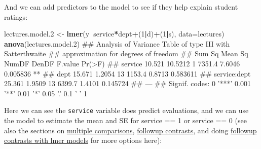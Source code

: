 \documentclass[]{article}
\newenvironment{Shaded}{\begin{snugshade}}{\end{snugshade}}
\newcommand{\KeywordTok}[1]{\textcolor[rgb]{0.13,0.29,0.53}{\textbf{#1}}}
\newcommand{\DataTypeTok}[1]{\textcolor[rgb]{0.13,0.29,0.53}{#1}}
\newcommand{\DecValTok}[1]{\textcolor[rgb]{0.00,0.00,0.81}{#1}}
\newcommand{\StringTok}[1]{\textcolor[rgb]{0.31,0.60,0.02}{#1}}
\newcommand{\OperatorTok}[1]{\textcolor[rgb]{0.81,0.36,0.00}{\textbf{#1}}}
\newcommand{\NormalTok}[1]{#1}
\theoremstyle{definition}
\theoremstyle{definition}
\theoremstyle{definition}
\theoremstyle{remark}
\begin{document}
And we can add predictors to the model to see if they help explain
student ratings:

\begin{Shaded}
\begin{Highlighting}[]
\NormalTok{lectures.model.}\DecValTok{2}\NormalTok{ <-}\StringTok{ }\KeywordTok{lmer}\NormalTok{(y}\OperatorTok{~}\NormalTok{service}\OperatorTok{*}\NormalTok{dept}\OperatorTok{+}\NormalTok{(}\DecValTok{1}\OperatorTok{|}\NormalTok{d)}\OperatorTok{+}\NormalTok{(}\DecValTok{1}\OperatorTok{|}\NormalTok{s), }\DataTypeTok{data=}\NormalTok{lectures)}
\KeywordTok{anova}\NormalTok{(lectures.model.}\DecValTok{2}\NormalTok{)}
\NormalTok{## Analysis of Variance Table of type III  with  Satterthwaite }
\NormalTok{## approximation for degrees of freedom}
\NormalTok{##              Sum Sq Mean Sq NumDF  DenDF F.value   Pr(>F)   }
\NormalTok{## service      10.521 10.5212     1 7351.4  7.6046 0.005836 **}
\NormalTok{## dept         15.671  1.2054    13 1153.4  0.8713 0.583611   }
\NormalTok{## service:dept 25.361  1.9509    13 6399.7  1.4101 0.145724   }
\NormalTok{## ---}
\NormalTok{## Signif. codes:  0 '***' 0.001 '**' 0.01 '*' 0.05 '.' 0.1 ' ' 1}
\end{Highlighting}
\end{Shaded}

Here we can see the \texttt{service} variable does predict evaluations,
and we can use the model to estimate the mean and SE for service == 1 or
service == 0 (see also the sections on
\protect\hyperlink{multiple-comparisons}{multiple comparisons},
\protect\hyperlink{contrasts}{followup contrasts}, and doing
\protect\hyperlink{contrasts-lmer}{followup contrasts with lmer models}
for more options here):

\begin{Shaded}
\end{Shaded}
\end{document}
